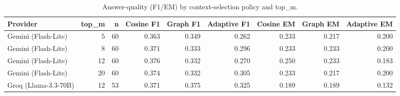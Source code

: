 \begin{table}
\caption{Answer-quality (F1/EM) by context-selection policy and top\_m.}
\label{tab:qa_quality}
\begin{tabular}{lrrrrrrrr}
\toprule
Provider & top\_m & n & Cosine F1 & Graph F1 & Adaptive F1 & Cosine EM & Graph EM & Adaptive EM \\
\midrule
Gemini (Flash-Lite) & 5 & 60 & 0.363 & 0.349 & 0.262 & 0.233 & 0.217 & 0.200 \\
Gemini (Flash-Lite) & 8 & 60 & 0.371 & 0.333 & 0.296 & 0.233 & 0.233 & 0.200 \\
Gemini (Flash-Lite) & 12 & 60 & 0.376 & 0.332 & 0.270 & 0.250 & 0.233 & 0.183 \\
Gemini (Flash-Lite) & 20 & 60 & 0.374 & 0.332 & 0.305 & 0.233 & 0.217 & 0.200 \\
Groq (Llama-3.3-70B) & 12 & 53 & 0.371 & 0.375 & 0.325 & 0.189 & 0.189 & 0.132 \\
\bottomrule
\end{tabular}
\end{table}
